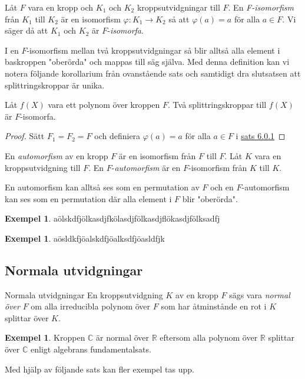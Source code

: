 \documentclass{article}
\theoremstyle{definition}
\newtheorem{exmp}[thm]{Exempel}
\begin{document}
\begin{mydef}{}{}
  Låt $F$ vara en kropp och $K_1$ och $K_2$ kroppsutvidgningar till $F$. En \textit{F-isomorfism} från $K_1$ till $K_2$ är en isomorfism 
  $\varphi: K_1 \rightarrow K_2$ så att $\varphi(a) = a$ för alla $a \in F.$ Vi säger då att $K_1$ och $K_2$ är $F$-\textit{isomorfa}.
\end{mydef}
I en $F$-isomorfism mellan två kroppsutvidgningar så blir alltså alla element i baskroppen "oberörda" och mappas till säg själva. Med denna definition 
kan vi notera följande korollarium från ovanstående sats och samtidigt dra slutsatsen att splittringskroppar är unika.

\begin{mykol}{}{}
  Låt $f(X)$ vara ett polynom över kroppen $F$. Två splittringskroppar till $f(X)$ är $F$-isomorfa. 
\end{mykol}
\begin{proof}
  Sätt $F_1 = F_2 = F$ och definiera $\varphi(a) = a$ för alla $a \in F$ i \hyperlink{sats6.0.1}{sats 6.0.1}
\end{proof}

\begin{mydef}{}{}
  En \textit{automorfism} av en kropp $F$ är en isomorfism från $F$ till $F$. Låt $K$ vara en kroppsutvidgning till $F$. En $F$-\textit{automorfism} 
  är en $F$-isomorfism från $K$ till $K.$
\end{mydef}
En automorfism kan alltså ses som en permutation av $F$ och en $F$-automorfism kan ses som en permutation där alla element i $F$ blir "oberörda".
\begin{exmp}
  aölskdfjölkasdjfkölasdjfölkasdjflökasdjfölksadfj
\end{exmp}
\begin{exmp}
  aösldkfjöalskdfjöalksdfjöasldfjk
\end{exmp}

\subsection{Normala utvidgningar}
\begin{mydef}{Normala utvidgningar}{}
  En kroppsutvidgning $K$ av en kropp $F$ sägs vara \textit{normal över} $F$ om alla irreducibla polynom över $F$ som har åtminstånde en rot i $K$ splittar 
  över $K$.
\end{mydef}

\begin{exmp}
  Kroppen $\mathbb{C}$ är normal över $\mathbb{R}$ eftersom alla polynom över $\mathbb{R}$ splittar över $\mathbb{C}$ enligt 
  algebrans fundamentalsats. 
\end{exmp}
Med hjälp av följande sats kan fler exempel tas upp. 
\end{document}
